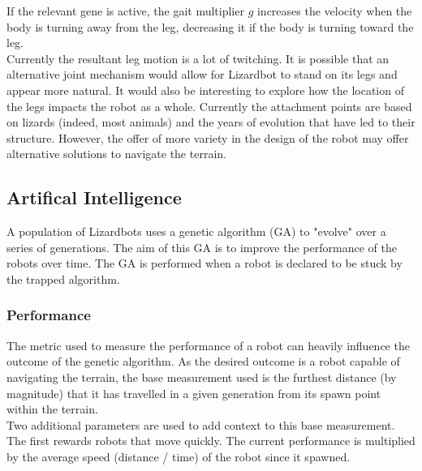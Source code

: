 \documentclass{article}
\begin{document}
\noindent If the relevant gene is active, the gait multiplier $g$ increases the velocity when the body is turning away from the leg, decreasing it if the body is turning toward the leg.\\

Currently the resultant leg motion is a lot of twitching. It is possible that an alternative joint mechanism would allow for Lizardbot to stand on its legs and appear more natural. It would also be interesting to explore how the location of the legs impacts the robot as a whole. Currently the attachment points are based on lizards (indeed, most animals) and the years of evolution that have led to their structure. However, the offer of more variety in the design of the robot may offer alternative solutions to navigate the terrain. 


\subsection{Artifical Intelligence}
\label{sec:AI Imp}
A population of Lizardbots uses a genetic algorithm (GA) to "evolve" over a series of generations. The aim of this GA is to improve the performance of the robots over time. The GA is performed when a robot is declared to be stuck by the trapped algorithm. 

\subsubsection{Performance}
\label{sec:Performance Imp}
The metric used to measure the performance of a robot can heavily influence the outcome of the genetic algorithm. As the desired outcome is a robot capable of navigating the terrain, the base measurement used is the furthest distance (by magnitude) that it has travelled in a given generation from its spawn point within the terrain. \\

Two additional parameters are used to add context to this base measurement. The first rewards robots that move quickly. The current performance is multiplied by the average speed (distance / time) of the robot since it spawned.\\
\end{document}
